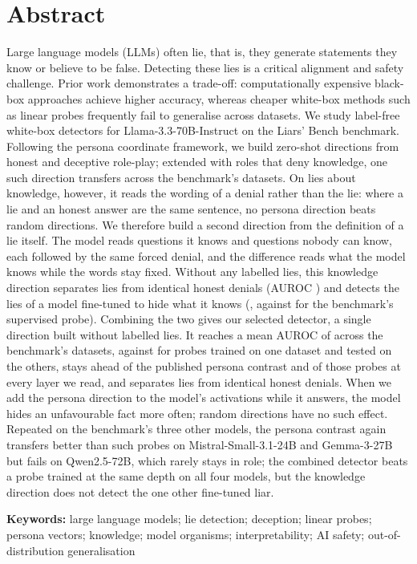 \section*{Abstract}

Large language models (LLMs) often lie, that is, they generate statements they know or believe to
be false. Detecting these lies is a critical alignment and safety challenge. Prior work demonstrates a
trade-off: computationally expensive black-box approaches achieve higher accuracy, whereas cheaper
white-box methods such as linear probes frequently fail to generalise across datasets. We study
label-free white-box detectors for Llama-3.3-70B-Instruct on the Liars' Bench benchmark. Following the
persona coordinate framework, we build zero-shot directions from honest and deceptive role-play;
extended with roles that deny knowledge, one such direction transfers across the benchmark's datasets.
On lies about knowledge, however, it reads the wording
of a denial rather than the lie: where a lie and an honest answer are the same sentence, no persona
direction beats random directions. We therefore build a second direction from the definition of a lie
itself. The model reads questions it knows and questions nobody can know, each followed by the same
forced denial, and the difference reads what the model knows while the words stay fixed. Without any
labelled lies, this knowledge direction separates lies from identical honest denials (AUROC
) and detects the lies of a model fine-tuned to hide what it knows
(, against  for the benchmark's supervised probe). Combining the
two gives our selected detector, a single direction built without labelled lies. It reaches a mean
AUROC of  across the benchmark's datasets, against  for probes
trained on one dataset and tested on the others, stays ahead of the published persona contrast and of
those probes at every layer we read, and separates lies from identical honest denials. When we add
the persona direction to the model's activations while it answers, the model hides an unfavourable
fact more often; random directions have no such effect. Repeated on the benchmark's three other models,
the persona contrast again transfers better than such probes on Mistral-Small-3.1-24B and Gemma-3-27B but
fails on Qwen2.5-72B, which rarely stays in role; the combined detector beats a probe trained at the same
depth on all four models, but the knowledge direction does not detect the one other fine-tuned liar.

\vspace{1cm}
\textbf{Keywords:} large language models; lie detection; deception; linear probes; persona vectors;
knowledge; model organisms; interpretability; AI safety; out-of-distribution generalisation
\pagebreak
